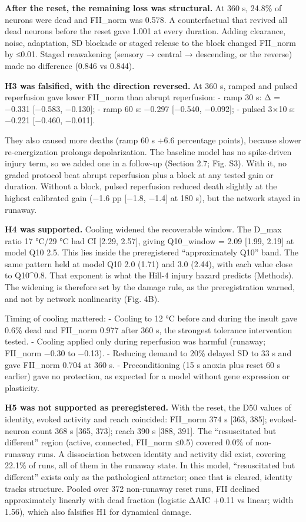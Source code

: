 \documentclass[11pt]{article}
\begin{document}
\textbf{After the reset, the remaining loss was structural.} At 360 s, 24.8\% of neurons were dead and FII\_norm was 0.578. A counterfactual that revived all dead neurons before the reset gave 1.001 at every duration. Adding clearance, noise, adaptation, SD blockade or staged release to the block changed FII\_norm by ≤0.01. Staged reawakening (sensory → central → descending, or the reverse) made no difference (0.846 vs 0.844).

\textbf{H3 was falsified, with the direction reversed.} At 360 s, ramped and pulsed reperfusion gave lower FII\_norm than abrupt reperfusion:
- ramp 30 s: Δ = −0.331 {[}−0.583, −0.130{]};
- ramp 60 s: −0.297 {[}−0.540, −0.092{]};
- pulsed 3×10 s: −0.221 {[}−0.460, −0.011{]}.

They also caused more deaths (ramp 60 s +6.6 percentage points), because slower re-energization prolongs depolarization. The baseline model has no spike-driven injury term, so we added one in a follow-up (Section 2.7; Fig. S3). With it, no graded protocol beat abrupt reperfusion plus a block at any tested gain or duration. Without a block, pulsed reperfusion reduced death slightly at the highest calibrated gain (−1.6 pp {[}−1.8, −1.4{]} at 180 s), but the network stayed in runaway.

\textbf{H4 was supported.} Cooling widened the recoverable window. The D\_max ratio 17 °C/29 °C had CI {[}2.29, 2.57{]}, giving Q10\_window = 2.09 {[}1.99, 2.19{]} at model Q10 2.5. This lies inside the preregistered ``approximately Q10'' band. The same pattern held at model Q10 2.0 (1.71) and 3.0 (2.44), with each value close to Q10\^{}0.8. That exponent is what the Hill-4 injury hazard predicts (Methods). The widening is therefore set by the damage rule, as the preregistration warned, and not by network nonlinearity (Fig. 4B).

Timing of cooling mattered:
- Cooling to 12 °C before and during the insult gave 0.6\% dead and FII\_norm 0.977 after 360 s, the strongest tolerance intervention tested.
- Cooling applied only during reperfusion was harmful (runaway; FII\_norm −0.30 to −0.13).
- Reducing demand to 20\% delayed SD to 33 s and gave FII\_norm 0.704 at 360 s.
- Preconditioning (15 s anoxia plus reset 60 s earlier) gave no protection, as expected for a model without gene expression or plasticity.

\textbf{H5 was not supported as preregistered.} With the reset, the D50 values of identity, evoked activity and reach coincided: FII\_norm 374 s {[}363, 385{]}; evoked-neuron count 368 s {[}365, 373{]}; reach 390 s {[}388, 391{]}. The ``resuscitated but different'' region (active, connected, FII\_norm ≤0.5) covered 0.0\% of non-runaway runs. A dissociation between identity and activity did exist, covering 22.1\% of runs, all of them in the runaway state. In this model, ``resuscitated but different'' exists only as the pathological attractor; once that is cleared, identity tracks structure. Pooled over 372 non-runaway reset runs, FII declined approximately linearly with dead fraction (logistic ΔAIC +0.11 vs linear; width 1.56), which also falsifies H1 for dynamical damage.
\end{document}
